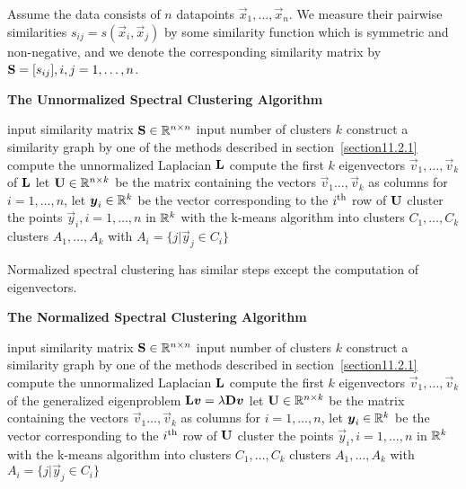 Assume the data consists of $n$ datapoints $\vec{x}_1,\dotsc,\vec{x}_n$. We measure their pairwise similarities $s_{ij}=s(\vec{x}_i,\vec{x}_j)$ by some similarity function which is symmetric and non-negative, and we denote the corresponding similarity matrix by $\mathbf{S}=[s_{ij}],i,j=1,\dotsc,n$.
\begin{algorithm}[H]
	\caption*{\bf The Unnormalized Spectral Clustering Algorithm}
	\begin{algorithmic}
		\State input similarity matrix $\mathbf{S}\in\mathbb{R}^{n\times n}$
		\State input number of clusters $k$
		\State construct a similarity graph by one of the methods described in section~\ref{section11.2.1}
		\State compute the unnormalized Laplacian $\mathbf{L}$
		\State compute the first $k$ eigenvectors $\vec{v}_1,\dotsc,\vec{v}_k$ of $\mathbf{L}$
		\State let $\mathbf{U}\in\mathbb{R}^{n\times k}$ be the matrix containing the vectors $\vec{v}_1\dotsc,\vec{v}_k$ as columns
		\State for $i=1,\dotsc,n$, let $\boldsymbol{y}_i\in\mathbb{R}^k$ be the vector corresponding to the $i^\text{th}$ row of $\mathbf{U}$
		\State cluster the points $\vec{y}_i,i=1,\dotsc,n$ in $\mathbb{R}^k$ with the k-means algorithm into clusters $C_1,\dotsc,C_k$
		\State \Return clusters $A_1,\dotsc,A_k$ with $A_i=\{j|\vec{y}_j\in C_i\}$
	\end{algorithmic}
\end{algorithm}
Normalized spectral clustering has similar steps except the computation of eigenvectors.
\begin{algorithm}[H]
	\caption*{\bf The Normalized Spectral Clustering Algorithm}
	\begin{algorithmic}
		\State input similarity matrix $\mathbf{S}\in\mathbb{R}^{n\times n}$
		\State input number of clusters $k$
		\State construct a similarity graph by one of the methods described in section~\ref{section11.2.1}
		\State compute the unnormalized Laplacian $\mathbf{L}$
		\State compute the first $k$ eigenvectors $\vec{v}_1,\dotsc,\vec{v}_k$ of the generalized eigenproblem $\mathbf{L}\boldsymbol{v}=\lambda\mathbf{D}\boldsymbol{v}$
		\State let $\mathbf{U}\in\mathbb{R}^{n\times k}$ be the matrix containing the vectors $\vec{v}_1\dotsc,\vec{v}_k$ as columns
		\State for $i=1,\dotsc,n$, let $\boldsymbol{y}_i\in\mathbb{R}^k$ be the vector corresponding to the $i^\text{th}$ row of $\mathbf{U}$
		\State cluster the points $\vec{y}_i,i=1,\dotsc,n$ in $\mathbb{R}^k$ with the k-means algorithm into clusters $C_1,\dotsc,C_k$
		\State \Return clusters $A_1,\dotsc,A_k$ with $A_i=\{j|\vec{y}_j\in C_i\}$
	\end{algorithmic}
\end{algorithm}

